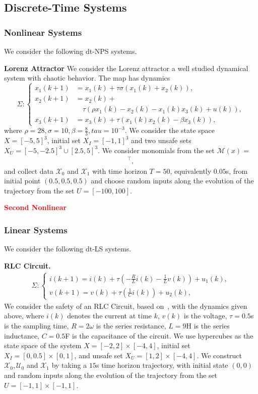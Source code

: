 \documentclass[sigconf]{acmart}
\newcommand{\BW}{\textcolor{red}}
\begin{document}
\subsection{Discrete-Time Systems}

\subsubsection{Nonlinear Systems}
We consider the following dt-NPS systems.

\noindent\textbf{Lorenz Attractor}
We consider the Lorenz attractor a well studied dynamical system with chaotic behavior. The map has dynamics
\begin{equation*}
\Sigma : \begin{cases}
x_1(k+1) &= x_1(k) + \tau\sigma (x_1(k) + x_2(k)), \\
x_2(k+1) &= x_2(k) +\\ &\quad\tau (\rho x_1(k) - x_2(k) - x_1(k)x_3(k) + u(k)), \\
x_3(k+1) &= x_3(k) + \tau (x_1(k)x_2(k)-\beta x_3(k)),
\end{cases}
\end{equation*}
where $\rho=28, \sigma=10,\beta=\frac{8}{3}, tau=10^{-3}$. We consider the state space $X=[-5,5]^3$, initial set $X_I=[-1, 1]^3$ and two unsafe sets $X_U=[-5,-2.5]^3\cup[2.5,5]^3$. We consider monomials from the set $\mathcal{M}(x)=$ \begin{align*}
[x_1(k)~&x_2(k)~x_3(k)~x_1(k)x_2(k)~ x_2x_3(k)~x_1(k)x_3(k)]^\top,
\end{align*}
and collect data $\mathcal{X}_0$ and $\mathcal{X}_1$ with time horizon $T=50$, equivalently $0.05$s, from initial point $(0.5, 0.5,0.5)$ and choose random inputs along the evolution of the trajectory from the set $U=[-100,100]$.

\noindent\BW{\textbf{Second Nonlinear}}

\subsubsection{Linear Systems}%
We consider the following dt-LS systems.

\noindent\textbf{RLC Circuit.}
\begin{align*}
\Sigma : \begin{cases}
i(k+1) = i(k) + \tau(-\frac{R}{L}i(k) - \frac{1}{L}v(k)) + u_1(k), \\
v(k+1) = v(k) + \tau(\frac{1}{C}i(k)) + u_2(k),
\end{cases}
\end{align*}
We consider the safety of an RLC Circuit, based on~\cite{anand2022kstochastic}, with the dynamics given above, where $i(k)$ denotes the current at time $k$, $v(k)$ is the voltage, $\tau=0.5$s is the sampling time, $R=2\omega$ is the series resistance, $L=9$H is the series inductance, $C=0.5$F is the capacitance of the circuit. We use hypercubes as the state space of the system $X=[-2,2]\times[-4,4]$, initial set $X_I=[0,0.5]\times[0,1]$, and unsafe set $X_U=[1,2]\times[-4,4]$. We construct $\mathcal{X}_{0},\mathcal{U}_{0}$ and $\mathcal{X}_{1}$ by taking a $15$s time horizon trajectory, with initial state $(0,0)$ and random inputs along the evolution of the trajectory from the set $U=[-1,1]\times[-1,1]$.
\end{document}
